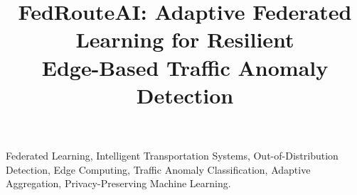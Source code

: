 \documentclass[conference]{IEEEtran}
\begin{document}
\title{FedRouteAI: Adaptive Federated Learning for Resilient\\
Edge-Based Traffic Anomaly Detection}

\author{
}

\maketitle



\begin{IEEEkeywords}
Federated Learning, Intelligent Transportation Systems, Out-of-Distribution Detection, Edge Computing, Traffic Anomaly Classification, Adaptive Aggregation, Privacy-Preserving Machine Learning.
\end{IEEEkeywords}








\balance


\end{document}
